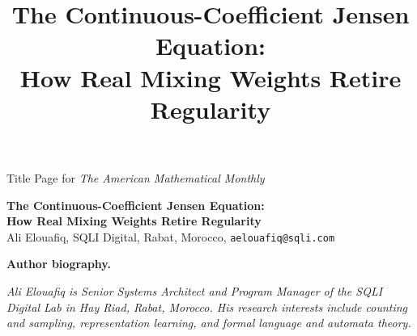 \documentclass{article}
\theoremstyle{plain}
\theoremstyle{definition}
\begin{document}
\begin{center}
{\LARGE{Title Page for \textit{The American Mathematical Monthly}}}
\end{center}

\vspace{100px}
\begin{center}
\textbf{\large The Continuous-Coefficient Jensen Equation:} \\
\textbf{\large How Real Mixing Weights Retire Regularity} \\
\vspace{30px}
Ali Elouafiq, SQLI Digital, Rabat, Morocco, 
\texttt{aelouafiq@sqli.com}
\end{center}

\vspace{20px}
\begin{center}
\textbf{Author biography.}
\begin{minipage}{0.85\linewidth}
\small\itshape
Ali Elouafiq is Senior Systems Architect and Program Manager of the
SQLI Digital Lab in Hay Riad, Rabat, Morocco. His research interests
include counting and sampling, representation learning, and formal language and automata theory.
\end{minipage}
\end{center}

\pagebreak


\title{The Continuous-Coefficient Jensen Equation:\\
       How Real Mixing Weights Retire Regularity}


\author{}

\maketitle
\end{document}
